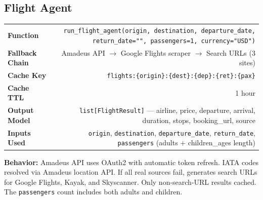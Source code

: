 \documentclass[11pt,a4paper]{article}
\begin{document}
\subsection{Flight Agent}
\begin{infobox}
{\small
\begin{tabularx}{\textwidth}{@{}L{3cm}R@{}}
\textbf{Function}     & \texttt{run\_flight\_agent(origin, destination, departure\_date, return\_date="", passengers=1, currency="USD")} \\[3pt]
\textbf{Fallback Chain} & Amadeus API $\to$ Google Flights scraper $\to$ Search URLs (3 sites) \\[3pt]
\textbf{Cache Key}     & \texttt{flights:\{origin\}:\{dest\}:\{dep\}:\{ret\}:\{pax\}} \\[3pt]
\textbf{Cache TTL}     & 1 hour \\[3pt]
\textbf{Output Model}  & \texttt{list[FlightResult]} --- airline, price, departure, arrival, duration, stops, booking\_url, source \\[3pt]
\textbf{Inputs Used}   & \texttt{origin}, \texttt{destination}, \texttt{departure\_date}, \texttt{return\_date}, \texttt{passengers} (adults + children\_ages length) \\
\end{tabularx}}

\textbf{Behavior:} Amadeus API uses OAuth2 with automatic token refresh. IATA codes resolved via Amadeus location API. If all real sources fail, generates search URLs for Google Flights, Kayak, and Skyscanner. Only non-search-URL results cached. The \texttt{passengers} count includes both adults and children.
\end{infobox}

\end{document}
